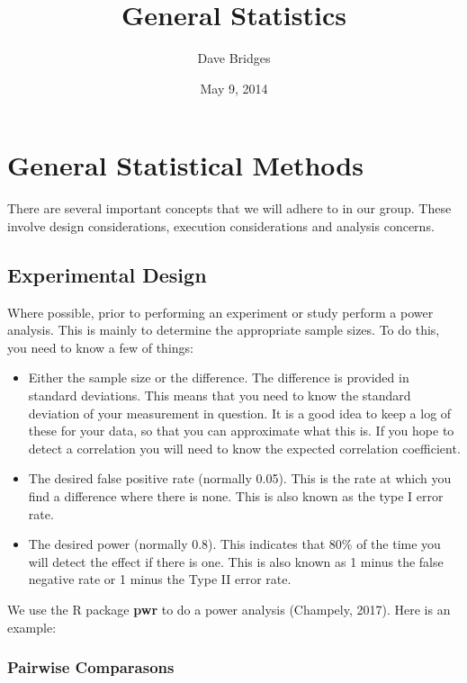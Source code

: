 \documentclass[]{article}
\title{General Statistics}
\author{Dave Bridges}
\date{May 9, 2014}
\providecommand{\tightlist}{%
  \setlength{\itemsep}{0pt}\setlength{\parskip}{0pt}}
\begin{document}
\maketitle

{
\setcounter{tocdepth}{2}
\tableofcontents
}
\section{General Statistical Methods}\label{general-statistical-methods}

There are several important concepts that we will adhere to in our
group. These involve design considerations, execution considerations and
analysis concerns.

\subsection{Experimental Design}\label{experimental-design}

Where possible, prior to performing an experiment or study perform a
power analysis. This is mainly to determine the appropriate sample
sizes. To do this, you need to know a few of things:

\begin{itemize}
\tightlist
\item
  Either the sample size or the difference. The difference is provided
  in standard deviations. This means that you need to know the standard
  deviation of your measurement in question. It is a good idea to keep a
  log of these for your data, so that you can approximate what this is.
  If you hope to detect a correlation you will need to know the expected
  correlation coefficient.
\item
  The desired false positive rate (normally 0.05). This is the rate at
  which you find a difference where there is none. This is also known as
  the type I error rate.
\item
  The desired power (normally 0.8). This indicates that 80\% of the time
  you will detect the effect if there is one. This is also known as 1
  minus the false negative rate or 1 minus the Type II error rate.
\end{itemize}

We use the R package \textbf{pwr} to do a power analysis (Champely,
2017). Here is an example:

\subsubsection{Pairwise Comparasons}\label{pairwise-comparasons}
\end{document}
